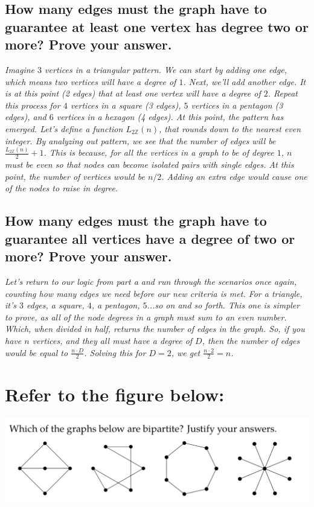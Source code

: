 \documentclass{article}
\begin{document}
\subsection{How many edges must the graph have to guarantee at least one vertex has degree
    two or more? Prove your answer.}
\hspace{1cm}\textit{Imagine $3$ vertices in a triangular pattern. We can start by adding one
    edge, which means two vertices will have a degree of $1$. Next, we'll add another edge. It
    is at this point (2 edges) that at least one vertex will have a degree of $2$. Repeat this process for
    $4$ vertices in a square (3 edges), $5$ vertices in a pentagon (3 edges), and $6$ vertices in
    a hexagon (4 edges). At this point, the pattern has emerged. Let's define a function $L_{2\mathbb{Z}}(n)$,
    that rounds down to the nearest even integer. By analyzing out pattern, we see that the number of edges
    will be $\frac{L_{2\mathbb{Z}}(n)}{2}+1$. This is because, for all the vertices in a graph to be of degree $1$,
    $n$ must be even so that nodes can become isolated pairs with single edges. At this point, the number of
    vertices would be $n/2$. Adding an extra edge would cause one of the nodes to raise in degree.}
\subsection{How many edges must the graph have to guarantee all vertices have a degree of
    two or more? Prove your answer.}
\hspace{1cm}\textit{Let's return to our logic from part a and run through the scenarios once again,
    counting how many edges we need before our new criteria is met. For a triangle, it's $3$ edges,
    a square, $4$, a pentagon, $5$...so on and so forth. This one is simpler to prove, as all of the
    node degrees in a graph must sum to an even number. Which, when divided in half, returns the number
    of edges in the graph. So, if you have $n$ vertices, and they all must have a degree of $D$, then the
    number of edges would be equal to $\frac{n\cdot D}{2}$. Solving this for $D=2$, we get $\frac{n\cdot 2}{2} = n$.}
\clearpage


\section{Refer to the figure below:}
\includegraphics[scale=0.66]{assignment5-problem6.png}
\end{document}
